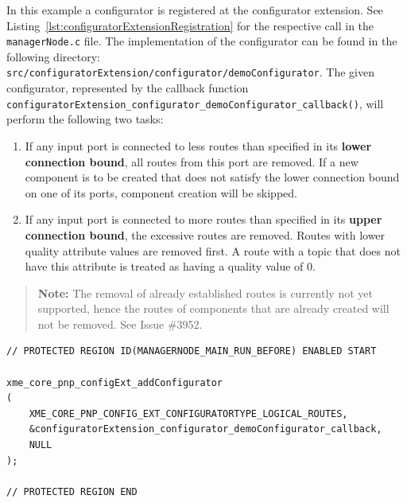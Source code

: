 In this example a configurator is registered at the configurator extension.
See Listing~\ref{lst:configuratorExtensionRegistration} for the respective call in the \texttt{managerNode.c} file.
The implementation of the configurator can be found in the following directory:\newline
\texttt{src/configuratorExtension/configurator/demoConfigurator}.
%
The given configurator,
represented by the callback function \lstinline{configuratorExtension_configurator_demoConfigurator_callback()},
will perform the following two tasks:
%
\begin{enumerate}
	\item
		If any input port is connected to less routes than specified in its \textbf{lower connection bound},
		all routes from this port are removed.
		If a new component is to be created that does not satisfy the lower connection bound on one of its ports,
		component creation will be skipped.
	\item
		If any input port is connected to more routes than specified in its \textbf{upper connection bound},
		the excessive routes are removed. Routes with lower quality attribute values are removed first.
		A route with a topic that does not have this attribute is treated as having a quality value of $0$.
\end{enumerate}

\begin{quote}
\textbf{Note:} The removal of already established routes is currently not yet supported,
hence the routes of components that are already created will not be removed.
See Issue \#3952.
\end{quote}

\begin{lstlisting}[float,label={lst:configuratorExtensionRegistration},caption={Registration of configurator.},breaklines]
// PROTECTED REGION ID(MANAGERNODE_MAIN_RUN_BEFORE) ENABLED START

xme_core_pnp_configExt_addConfigurator
(
    XME_CORE_PNP_CONFIG_EXT_CONFIGURATORTYPE_LOGICAL_ROUTES,
    &configuratorExtension_configurator_demoConfigurator_callback,
    NULL
);

// PROTECTED REGION END
\end{lstlisting}

